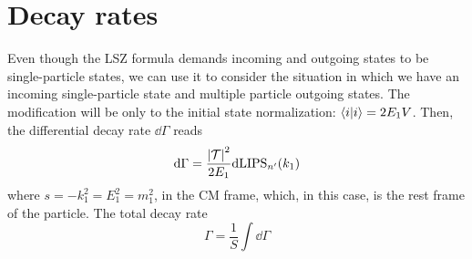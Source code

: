 \section{Decay rates}
Even though the LSZ formula demands incoming and outgoing states to be single-particle states, we can use it to consider the situation in which we have an incoming single-particle state and multiple particle outgoing states. The modification will be only to the initial state normalization: $\braket{i}{i}=2E_1V$. Then, the differential decay rate $\dd \Gamma$ reads
\begin{equation}
    \dd \Gamma =\frac{\abs{\mathcal{T}}^2}{2E_1}\dd\text{LIPS}_{n^\prime}(k_1)
\end{equation}
where $s=-k_1^2=E_1^2=m_1^2$, in the CM frame, which, in this case, is the rest frame of the particle. The total decay rate 
\begin{equation}
    \Gamma = \frac{1}{S}\int\dd \Gamma
\end{equation}
